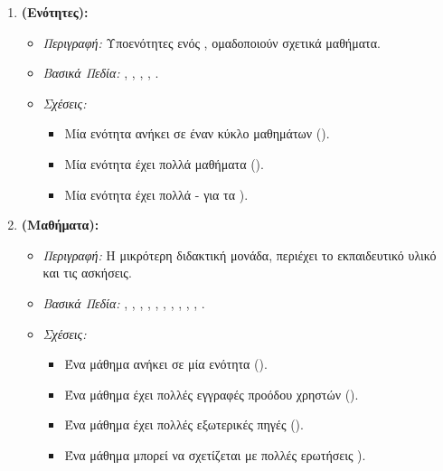 \begin{enumerate}[leftmargin=*, label=\arabic*., wide, labelwidth=!, labelindent=0pt, itemsep=1ex]
    \item \textbf{\texttt{} (Ενότητες):}
        \begin{itemize}[leftmargin=1.5em, noitemsep]
            \item \textit{Περιγραφή:} Υποενότητες ενός , ομαδοποιούν σχετικά μαθήματα.
            \item \textit{Βασικά Πεδία:} \texttt{}, \texttt{}, \texttt{}, \texttt{}, \texttt{}.
            \item \textit{Σχέσεις:}
            \begin{itemize}[leftmargin=1.5em, noitemsep]
                \item Μία ενότητα ανήκει σε έναν κύκλο μαθημάτων ().
                \item Μία ενότητα έχει πολλά μαθήματα ().
                \item Μία ενότητα έχει πολλά  - για τα ).
            \end{itemize}
        \end{itemize}

    \item \textbf{\texttt{} (Μαθήματα):}
        \begin{itemize}[leftmargin=1.5em, noitemsep]
            \item \textit{Περιγραφή:} Η μικρότερη διδακτική μονάδα, περιέχει το εκπαιδευτικό υλικό και τις ασκήσεις.
            \item \textit{Βασικά Πεδία:} \texttt{}, \texttt{}, \texttt{}, \texttt{}, \texttt{}, \texttt{}, \texttt{}, \texttt{}, \texttt{}, \texttt{}, \texttt{}.
            \item \textit{Σχέσεις:}
            \begin{itemize}[leftmargin=1.5em, noitemsep]
                \item Ένα μάθημα ανήκει σε μία ενότητα ().
                \item Ένα μάθημα έχει πολλές εγγραφές προόδου χρηστών ().
                \item Ένα μάθημα έχει πολλές εξωτερικές πηγές ().
                \item Ένα μάθημα μπορεί να σχετίζεται με πολλές ερωτήσεις ).
            \end{itemize}
        \end{itemize}


\end{enumerate}
